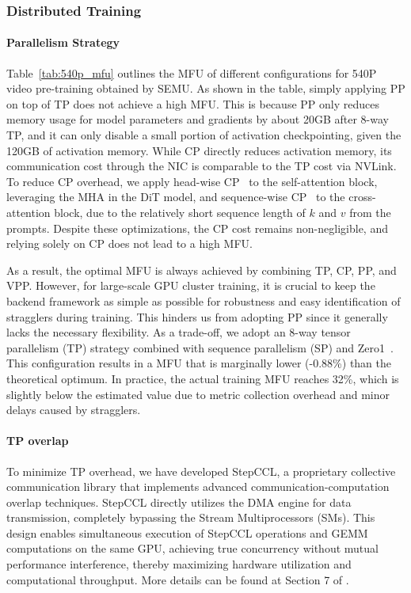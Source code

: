 \subsubsection{Distributed Training}
\label{subsubsec:system_dist}



\paragraph{Parallelism Strategy}
Table~\ref{tab:540p_mfu} outlines the MFU of different configurations for 540P video pre-training obtained by SEMU. As shown in the table, simply applying PP on top of TP does not achieve a high MFU. This is because PP only reduces memory usage for model parameters and gradients by about 20GB after 8-way TP, and it can only disable a small portion of activation checkpointing, given the 120GB of activation memory. While CP directly reduces activation memory, its communication cost through the NIC is comparable to the TP cost via NVLink. To reduce CP overhead, we apply head-wise CP~\cite{hcp} to the self-attention block, leveraging the MHA in the DiT model, and sequence-wise CP~\cite{scp} to the cross-attention block, due to the relatively short sequence length of $k$ and $v$ from the prompts. Despite these optimizations, the CP cost remains non-negligible, and relying solely on CP does not lead to a high MFU.

As a result, the optimal MFU is always achieved by combining TP, CP, PP, and VPP. However, for large-scale GPU cluster training, it is crucial to keep the backend framework as simple as possible for robustness and easy identification of stragglers during training. This hinders us from adopting PP since it generally lacks the necessary flexibility. As a trade-off, we adopt an 8-way tensor parallelism (TP) strategy combined with sequence parallelism (SP) and Zero1~\cite{zero2020}. This configuration results in a MFU that is marginally lower (-0.88\%) than the theoretical optimum. In practice, the actual training MFU reaches 32\%, which is slightly below the estimated value due to metric collection overhead and minor delays caused by stragglers.




\paragraph{TP overlap} To minimize TP overhead, we have developed StepCCL, a proprietary collective communication library that implements advanced communication-computation overlap techniques. StepCCL directly utilizes the DMA engine for data transmission, completely bypassing the Stream Multiprocessors (SMs). This design enables simultaneous execution of StepCCL operations and GEMM computations on the same GPU, achieving true concurrency without mutual performance interference, thereby maximizing hardware utilization and computational throughput. More details can be found at Section 7 of \cite{disttrain}.


